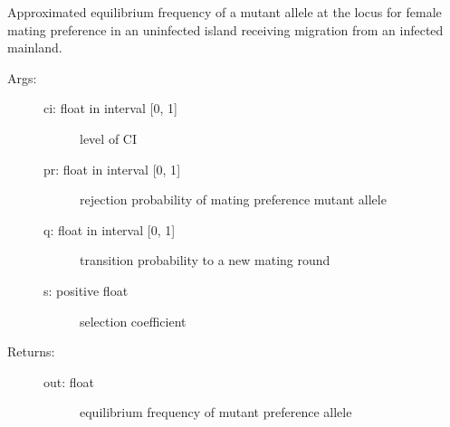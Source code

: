 \documentclass[letterpaper,10pt,english]{sphinxmanual}
\begin{document}
\begin{fulllineitems}
\label{index:wspec.analytical.xPref}
Approximated equilibrium frequency of a mutant allele at the locus 
for female mating preference in an uninfected island receiving 
migration from an infected mainland.
\begin{description}
\item[{Args:}] \leavevmode\begin{description}
\item[{ci: float in interval {[}0, 1{]}}] \leavevmode
level of CI

\item[{pr: float in interval {[}0, 1{]}}] \leavevmode
rejection probability of mating preference mutant allele

\item[{q: float in interval {[}0, 1{]}}] \leavevmode
transition probability to a new mating round

\item[{s: positive float}] \leavevmode
selection coefficient

\end{description}

\item[{Returns:}] \leavevmode\begin{description}
\item[{out: float}] \leavevmode
equilibrium frequency of mutant preference allele

\end{description}

\end{description}

\end{fulllineitems}

\end{document}
